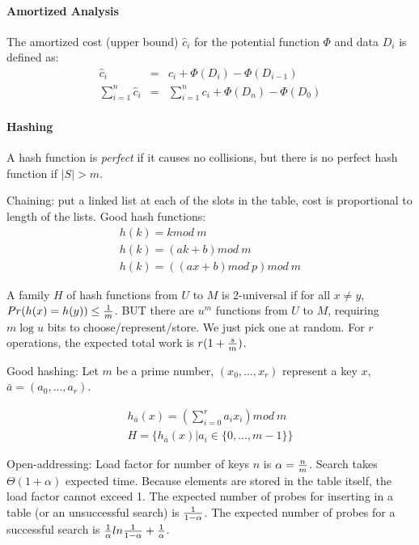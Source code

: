 \documentclass[10pt,letterpaper]{article}
\begin{document}

\paragraph{Amortized Analysis} The amortized cost (upper bound) $\hat{c}_i$ for the potential function $\Phi$ and data $D_i$ is defined as:
\begin{eqnarray*}
\hat{c}_i &=& c_i + \Phi(D_i) - \Phi(D_{i-1}) \\
\sum_{i=1}^n \hat{c}_i &=& \sum_{i=1}^n c_i + \Phi(D_n) - \Phi(D_0)
\end{eqnarray*}

\paragraph{Hashing} A hash function is \emph{perfect} if it causes no collisions, but there is no perfect hash function if $|S|>m$. 

Chaining: put a linked list at each of the slots in the table, cost is proportional to length of the lists. Good hash functions:
\begin{eqnarray*}
h(k) = k mod~m \\
h(k) = (ak + b) mod~m \\
h(k) = ((ax + b) mod~p) mod~m
\end{eqnarray*}

A family $H$ of hash functions from $U$ to $M$ is 2-universal if for all $x \neq y$, $Pr(h(x)=h(y)) \leq {1 \over m}$. BUT there are $u^m$ functions from $U$ to $M$, requiring $m \log u$ bits to choose/represent/store. We just pick one at random. For $r$ operations, the expected total work is $r(1+{s \over m})$. 

Good hashing: Let $m$ be a prime number, $(x_0, ..., x_r)$ represent a key $x$, $\bar{a}=(a_0, ..., a_r)$. 

\begin{eqnarray*}
h_{\bar{a}}(x)= (\sum_{i=0}^r a_i x_i) mod~m \\
H = \{ h_{\bar{a}}(x) | a_i \in \{0, ..., m-1 \} \}
\end{eqnarray*}

Open-addressing: Load factor for number of keys $n$ is $\alpha={n \over m}$. Search takes $\Theta(1+\alpha)$ expected time. Because elements are stored in the table itself, the load factor cannot exceed 1. The expected number of probes for inserting in a table (or an unsuccessful search) is $1 \over 1-\alpha$. The expected number of probes for a successful search is ${1 \over \alpha} ln {1 \over 1-\alpha} + {1 \over \alpha}$.
\end{document}
